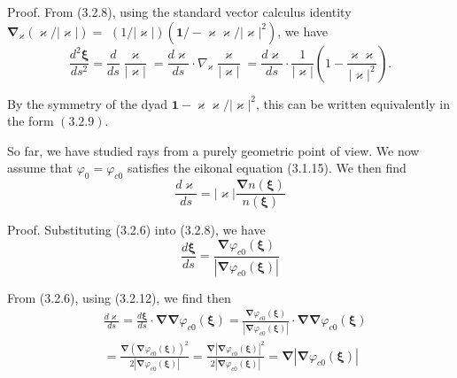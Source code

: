 \documentclass{article}
\begin{document}
Proof. From (3.2.8), using the standard vector calculus identity $\boldsymbol{\nabla}_{\boldsymbol{\varkappa}}(\boldsymbol{\varkappa} /|\boldsymbol{\varkappa}|)=$ $(1 /|\boldsymbol{\varkappa}|)\left(\mathbf{1} /-\boldsymbol{\varkappa} \boldsymbol{\varkappa} /|\boldsymbol{\varkappa}|^{2}\right)$, we have
$$
\begin{equation*}
\frac{d^{2} \boldsymbol{\xi}}{d s^{2}}=\frac{d}{d s} \frac{\varkappa}{|\varkappa|}=\frac{d \varkappa}{d s} \cdot \nabla_{\varkappa} \frac{\varkappa}{|\varkappa|}=\frac{d \varkappa}{d s} \cdot \frac{1}{|\varkappa|}\left(1-\frac{\varkappa \varkappa}{|\varkappa|^{2}}\right) . \tag{3.2.10}
\end{equation*}
$$

By the symmetry of the dyad $\mathbf{1}-\varkappa \varkappa /|\varkappa|^{2}$, this can be written equivalently in the form $(3.2 .9)$.

So far, we have studied rays from a purely geometric point of view. We now assume that $\varphi_{0}=\varphi_{c 0}$ satisfies the eikonal equation (3.1.15). We then find
$$
\begin{equation*}
\frac{d \varkappa}{d s}=|\varkappa| \frac{\boldsymbol{\nabla} n(\boldsymbol{\xi})}{n(\boldsymbol{\xi})} \tag{3.2.11}
\end{equation*}
$$

Proof. Substituting (3.2.6) into (3.2.8), we have
$$
\begin{equation*}
\frac{d \boldsymbol{\xi}}{d s}=\frac{\boldsymbol{\nabla} \varphi_{c 0}(\boldsymbol{\xi})}{\left|\boldsymbol{\nabla} \varphi_{c 0}(\boldsymbol{\xi})\right|} \tag{3.2.12}
\end{equation*}
$$

From (3.2.6), using (3.2.12), we find then
$$
\begin{align*}
& \frac{d \varkappa}{d s}=\frac{d \boldsymbol{\xi}}{d s} \cdot \boldsymbol{\nabla} \boldsymbol{\nabla} \varphi_{c 0}(\boldsymbol{\xi})=\frac{\boldsymbol{\nabla} \varphi_{c 0}(\boldsymbol{\xi})}{\left|\boldsymbol{\nabla} \varphi_{c 0}(\boldsymbol{\xi})\right|} \cdot \boldsymbol{\nabla} \boldsymbol{\nabla} \varphi_{c 0}(\boldsymbol{\xi})  \tag{3.2.13}\\
&=\frac{\boldsymbol{\nabla}\left(\boldsymbol{\nabla} \varphi_{c 0}(\boldsymbol{\xi})\right)^{2}}{2\left|\boldsymbol{\nabla} \varphi_{c 0}(\boldsymbol{\xi})\right|}=\frac{\boldsymbol{\nabla}\left|\boldsymbol{\nabla} \varphi_{c 0}(\boldsymbol{\xi})\right|^{2}}{2\left|\boldsymbol{\nabla} \varphi_{c 0}(\boldsymbol{\xi})\right|}=\boldsymbol{\nabla}\left|\boldsymbol{\nabla} \varphi_{c 0}(\boldsymbol{\xi})\right|
\end{align*}
$$
\end{document}
